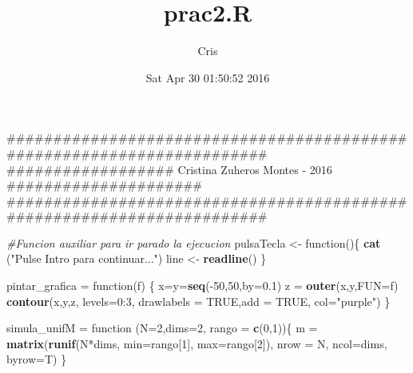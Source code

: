\documentclass[]{article}
\title{prac2.R}
\author{Cris}
\date{Sat Apr 30 01:50:52 2016}
\newenvironment{Shaded}{\begin{snugshade}}{\end{snugshade}}
\newcommand{\KeywordTok}[1]{\textcolor[rgb]{0.13,0.29,0.53}{\textbf{{#1}}}}
\newcommand{\DataTypeTok}[1]{\textcolor[rgb]{0.13,0.29,0.53}{{#1}}}
\newcommand{\DecValTok}[1]{\textcolor[rgb]{0.00,0.00,0.81}{{#1}}}
\newcommand{\FloatTok}[1]{\textcolor[rgb]{0.00,0.00,0.81}{{#1}}}
\newcommand{\StringTok}[1]{\textcolor[rgb]{0.31,0.60,0.02}{{#1}}}
\newcommand{\CommentTok}[1]{\textcolor[rgb]{0.56,0.35,0.01}{\textit{{#1}}}}
\newcommand{\OtherTok}[1]{\textcolor[rgb]{0.56,0.35,0.01}{{#1}}}
\newcommand{\NormalTok}[1]{{#1}}
\begin{document}
\maketitle

\begin{Shaded}
\begin{Highlighting}[]
\NormalTok{#######################################################################}
\NormalTok{################## Cristina Zuheros Montes - 2016 #####################}
\NormalTok{#######################################################################}

\CommentTok{#Funcion auxiliar para ir parado la ejecucion}
\NormalTok{pulsaTecla <-}\StringTok{ }\NormalTok{function()\{}
  \KeywordTok{cat} \NormalTok{(}\StringTok{"Pulse Intro para continuar..."}\NormalTok{)}
  \NormalTok{line <-}\StringTok{ }\KeywordTok{readline}\NormalTok{()}
\NormalTok{\}}

\NormalTok{pintar_grafica =}\StringTok{ }\NormalTok{function(f) \{}
  \NormalTok{x=y=}\KeywordTok{seq}\NormalTok{(-}\DecValTok{50}\NormalTok{,}\DecValTok{50}\NormalTok{,}\DataTypeTok{by=}\FloatTok{0.1}\NormalTok{)}
  \NormalTok{z =}\StringTok{ }\KeywordTok{outer}\NormalTok{(x,y,}\DataTypeTok{FUN=}\NormalTok{f)}
  \KeywordTok{contour}\NormalTok{(x,y,z, }\DataTypeTok{levels=}\DecValTok{0}\NormalTok{:}\DecValTok{3}\NormalTok{, }\DataTypeTok{drawlabels =} \OtherTok{TRUE}\NormalTok{,}\DataTypeTok{add =} \OtherTok{TRUE}\NormalTok{, }\DataTypeTok{col=}\StringTok{"purple"}\NormalTok{)}
\NormalTok{\}}

\NormalTok{simula_unifM =}\StringTok{ }\NormalTok{function (}\DataTypeTok{N=}\DecValTok{2}\NormalTok{,}\DataTypeTok{dims=}\DecValTok{2}\NormalTok{, }\DataTypeTok{rango =} \KeywordTok{c}\NormalTok{(}\DecValTok{0}\NormalTok{,}\DecValTok{1}\NormalTok{))\{}
  \NormalTok{m =}\StringTok{ }\KeywordTok{matrix}\NormalTok{(}\KeywordTok{runif}\NormalTok{(N*dims, }\DataTypeTok{min=}\NormalTok{rango[}\DecValTok{1}\NormalTok{], }\DataTypeTok{max=}\NormalTok{rango[}\DecValTok{2}\NormalTok{]),}
             \DataTypeTok{nrow =} \NormalTok{N, }\DataTypeTok{ncol=}\NormalTok{dims, }\DataTypeTok{byrow=}\NormalTok{T)}
\NormalTok{\}}


\end{Highlighting}
\end{Shaded}
\end{document}
